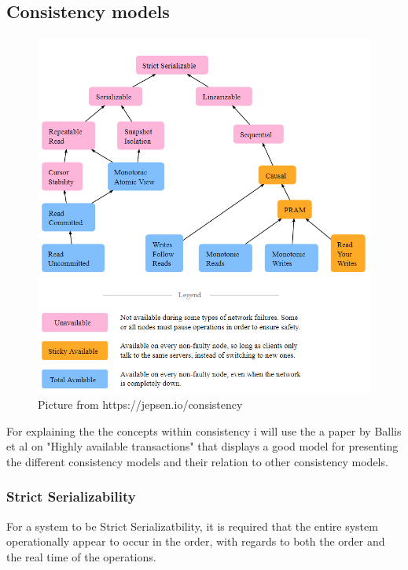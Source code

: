 \documentclass[a4paper,10pt,titlepage]{report}
\begin{document}
\newpage
\subsection{Consistency models}


\begin{figure}
    \centering
       \includegraphics[scale=0.4]{images/consistency models.PNG}
     \caption{Picture from https://jepsen.io/consistency}
     \label{fig:jepsenioconsistency}
\end{figure}


For explaining the the concepts within consistency i will use the a paper by Ballis et al on "Highly available transactions"\cite{10.14778/2732232.2732237} that displays a good model for presenting the different consistency models and their relation to other consistency models.\\


\subsubsection{Strict Serializability}

For a system to be Strict Serializatbility, it is required that the entire system operationally appear to occur in the order, with regards to both the order and the real time of the operations.\\
\vspace{5mm}
\end{document}
